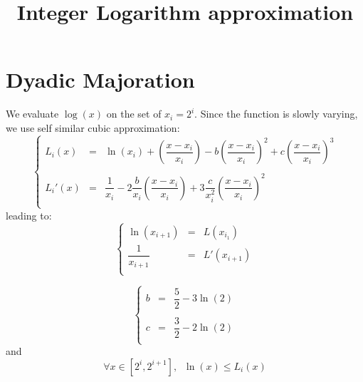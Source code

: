 \documentclass[aps]{revtex4}
\begin{document}
\title{Integer Logarithm approximation}
\maketitle

\section{Dyadic Majoration}
We evaluate $\log(x)$ on the set of $x_i=2^i$.
Since the function is slowly varying, we use self similar cubic approximation:
\begin{equation}
\left\lbrace
\begin{array}{rcl}
	L_i(x)  & = & \ln(x_i) + \left(\dfrac{x-x_i}{x_i}\right) - b \left(\dfrac{x-x_i}{x_i}\right)^2 + c\left(\dfrac{x-x_i}{x_i}\right)^3\\
	\\
	L_i'(x) & = & \dfrac{1}{x_i} - 2\dfrac{b}{x_i} \left(\dfrac{x-x_i}{x_i}\right) + 3 \dfrac{c}{x_i^2}  \left(\dfrac{x-x_i}{x_i}\right)^2 \\
\end{array}
\right.
\end{equation}
leading to:
\begin{equation}
\left\lbrace
\begin{array}{rcl}
	\ln(x_{i+1})       & = & L(x_{i_1})\\
	\dfrac{1}{x_{i+1}} & = & L'(x_{i+1}) \\
\end{array}
\right.
\end{equation}

\begin{equation}
\left\lbrace
\begin{array}{rcl}
b & = & \dfrac{5}{2}-3\ln(2)\\
\\
c & = & \dfrac{3}{2}-2\ln(2)\\
\end{array}
\right.
\end{equation}
and
\begin{equation}
\forall x\in[2^i,2^{i+1}], \;\; \ln(x) \leq L_i(x) 
\end{equation}
\end{document}
